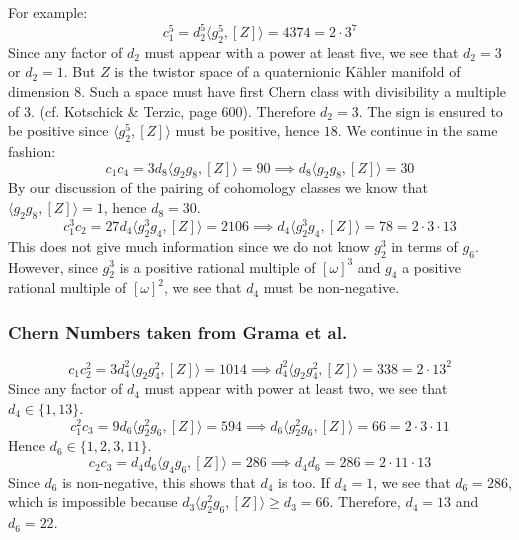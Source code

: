 \documentclass{scrartcl}
\begin{document}
For example:
\begin{equation*}
	c_1^5=d_2^5 \langle g_2^5,[Z]\rangle=4374=2\cdot 3^7
\end{equation*}
Since any factor of $d_2$ must appear with a power at least five, we see that $d_2=3$ or $d_2=1$. But $Z$ is the twistor space of a quaternionic K\"{a}hler manifold of dimension $8$. Such a space must have first Chern class with divisibility a multiple of $3$. (cf. Kotschick \& Terzic, page 600). Therefore $d_2=3$. The sign is ensured to be positive since $\langle g_2^5,[Z]\rangle$ must be positive, hence $18$. We continue in the same fashion:
\begin{equation*}
	c_1c_4=3d_8\langle g_2g_8,[Z]\rangle=90
	\implies d_8\langle g_2g_8,[Z]\rangle=30
\end{equation*}
By our discussion of the pairing of cohomology classes we know that $\langle g_2g_8,[Z]\rangle=1$, hence $d_8=30$.
\begin{equation*}
	c_1^3c_2=27d_4\langle g_2^3g_4,[Z]\rangle=2106
	\implies d_4\langle g_2^3g_4,[Z]\rangle=78=2\cdot 3\cdot 13
\end{equation*}
This does not give much information since we do not know $g_2^3$ in terms of $g_6$. However, since $g_2^3$ is a positive rational multiple of $[\omega]^3$ and $g_4$ a positive rational multiple of $[\omega]^2$, we see that $d_4$ must be non-negative.

\subsubsection{Chern Numbers taken from Grama et al.}

\begin{equation*}
	c_1c_2^2=3d_4^2\langle g_2g_4^2,[Z]\rangle=1014
	\implies d_4^2\langle g_2g_4^2,[Z]\rangle=338=2\cdot 13^2
\end{equation*}
Since any factor of $d_4$ must appear with power at least two, we see that $d_4\in \{1,13\}$.
\begin{equation*}
	c_1^2c_3=9d_6\langle g_2^2g_6,[Z]\rangle=594
	\implies d_6\langle g_2^2g_6,[Z]\rangle=66=2\cdot 3 \cdot 11
\end{equation*}
Hence $d_6\in\{1,2,3,11\}$. 
\begin{equation*}
	c_2c_3=d_4d_6\langle g_4g_6,[Z]\rangle=286\implies d_4d_6=286=2\cdot 11\cdot 13
\end{equation*}
Since $d_6$ is non-negative, this shows that $d_4$ is too. If $d_4=1$, we see that $d_6=286$, which is impossible because $d_3\langle g_2^2g_6,[Z]\rangle\geq d_3=66$. Therefore, $d_4=13$ and $d_6=22$.
\end{document}
